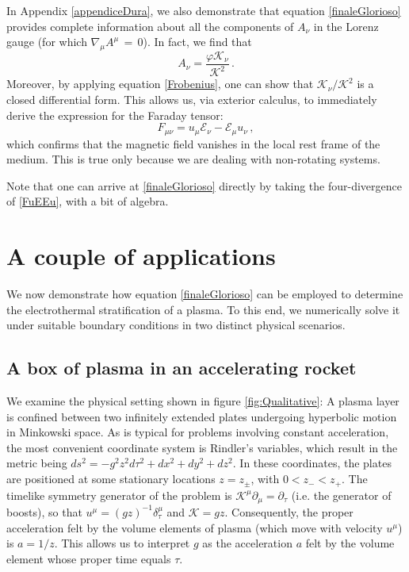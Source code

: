 \documentclass[a4paper, amsfonts, amssymb, amsmath, reprint, showkeys, nofootinbib, twoside, onecolumn,notitlepage]{revtex4-1}
\newcommand{\K}{{\mathcal{K}}}
\theoremstyle{definition}
\theoremstyle{theorem}
\begin{document}
In Appendix \ref{appendiceDura}, we also demonstrate that equation \eqref{finaleGlorioso}  provides complete information about all the components of $A_\nu$ in the Lorenz gauge (for which $\nabla_\mu A^\mu \,{=}\, 0$). In fact, we find that
\begin{equation}\label{wowcovaria}
A_\nu = \dfrac{\varphi \K_\nu}{\K^2} \, .
\end{equation}
Moreover, by applying equation \eqref{Frobenius}, one can show that $\K_\nu/\K^2$ is a closed differential form. This allows us, via exterior calculus, to immediately derive the expression for the Faraday tensor:
\begin{equation}\label{FuEEu}
F_{\mu \nu} = u_\mu \mathcal{E}_\nu - \mathcal{E}_\mu u_\nu \, ,
\end{equation}
which confirms that the magnetic field vanishes in the local rest frame of the medium. This is true only because we are dealing with non-rotating systems. 

Note that one can arrive at \eqref{finaleGlorioso} directly by taking the four-divergence of \eqref{FuEEu}, with a bit of algebra.


\section{A couple of applications}
\vspace{-0.3cm}

We now demonstrate how equation \eqref{finaleGlorioso} can be employed to determine the electrothermal stratification of a plasma. To this end, we numerically solve it under suitable boundary conditions in two distinct physical scenarios.

\vspace{-0.3cm}
\subsection{A box of plasma in an accelerating rocket}
\vspace{-0.3cm}

We examine the physical setting shown in figure \ref{fig:Qualitative}: A plasma layer is confined between two infinitely extended plates undergoing hyperbolic motion in Minkowski space. 
As is typical for problems involving constant acceleration, the most convenient coordinate system is Rindler's variables, which result in the metric being
$ds^2=-g^2 z^2 d\tau^2 +dx^2+dy^2+dz^2$. In these coordinates, the plates are positioned at some stationary locations $z=z_\pm$, with $0<z_-<z_+$. The timelike symmetry generator of the problem is $\K^\mu \partial_\mu=\partial_\tau$ (i.e. the generator of boosts), so that $u^\mu=(gz)^{-1}\delta^\mu_\tau$ and $\K=gz$. Consequently, the proper acceleration felt by the volume elements of plasma (which move with velocity $u^\mu$) is $a=1/z$. This allows us to interpret $g$ as the acceleration $a$ felt by the volume element whose proper time equals $\tau$.
\end{document}
